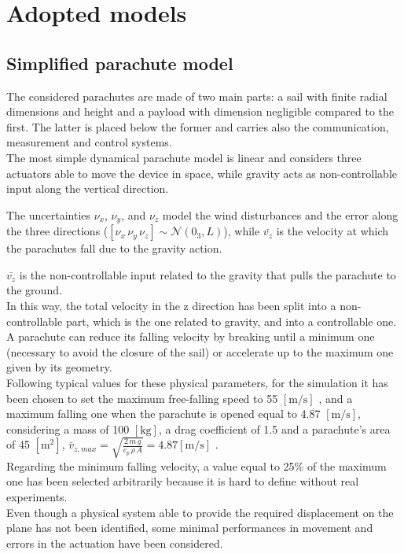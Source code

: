 \section{Adopted models}
\subsection{Simplified parachute model}
The considered parachutes are made of two main parts: a sail with finite radial dimensions and height and a payload with dimension negligible compared to the first. The latter is placed below the former and carries also the communication, measurement and control systems.\\
The most simple dynamical parachute model is linear and considers three actuators able to move the device in space, while gravity acts as non-controllable input along the vertical direction.

The uncertainties $\nu_x$, $\nu_y$, and $\nu_z$ model the wind disturbances and the error along the three directions ($\left[\nu_x \, \nu_y \,\nu_z \right]\sim\mathcal{N}\left(0_3, L\right)$), while $\bar{v_z}$ is the velocity at which the parachutes fall due to the gravity action. 

$\bar{v_z}$  is the non-controllable input related to the gravity that pulls the parachute to the ground.\\
In this way, the total velocity in the z direction has been split into a non-controllable part, which is the one related to gravity, and into a controllable one. A parachute can reduce its falling velocity by breaking until a minimum one (necessary to avoid the closure of the sail) or accelerate up to the maximum one given by its geometry.\\
Following typical values for these physical parameters, for the simulation it has been chosen to set the maximum free-falling speed to 55 $\left[\si{\meter\per\second}\right]$ \cite{b8}, and a maximum falling one when the parachute is opened equal to 4.87 $\left[\si{\meter\per\second}\right]$, considering a mass of 100 $\left[\si{\kilogram}\right]$, a drag coefficient of 1.5 and a parachute's area of 45 $\left[\si{\meter^2}\right]$,  $\bar{v}_{z,max} = \sqrt{\frac{2 \, m \, g}{c_p \, \rho \, A}} = 4.87 \left[\si{\meter\per\second}\right]$ \cite{b9}. \\
Regarding the minimum falling velocity, a value equal to 25\% of the maximum one has been selected arbitrarily because it is hard to define without real experiments.\\
Even though a physical system able to provide the required displacement on the plane has not been identified, some minimal performances in movement and errors in the actuation have been considered.

